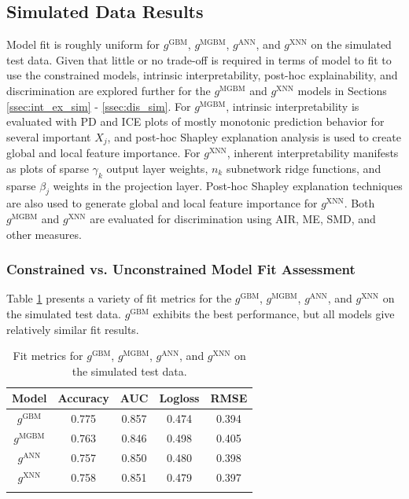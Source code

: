 \documentclass[information,article,submit,moreauthors,pdftex]{definitions/mdpi}
\begin{document}
\subsection{Simulated Data Results}

Model fit is roughly uniform for $g^\text{GBM}$, $g^\text{MGBM}$, $g^\text{ANN}$, and $g^\text{XNN}$ on the simulated test data. Given that little or no trade-off is required in terms of model to fit to use the constrained models, intrinsic interpretability, post-hoc explainability, and discrimination are explored further for the $g^\text{MGBM}$ and $g^\text{XNN}$ models in Sections \ref{ssec:int_ex_sim} - \ref{ssec:dis_sim}. For $g^\text{MGBM}$, intrinsic interpretability is evaluated with PD and ICE plots of mostly monotonic prediction behavior for several important $X_j$, and post-hoc Shapley explanation analysis is used to create global and local feature importance. For $g^\text{XNN}$, inherent interpretability manifests as plots of sparse $\gamma_k$ output layer weights, $n_k$ subnetwork ridge functions, and sparse $\beta_j$ weights in the projection layer. Post-hoc Shapley explanation techniques are also used to generate global and local feature importance for $g^\text{XNN}$. Both $g^\text{MGBM}$ and $g^\text{XNN}$ are evaluated for discrimination using AIR, ME, SMD, and other measures.

\subsubsection{Constrained vs. Unconstrained Model Fit Assessment}\label{ssec: c_v_uc_sim}

Table \ref{tab:sim_acc} presents a variety of fit metrics for the $g^\text{GBM}$, $g^\text{MGBM}$, $g^\text{ANN}$, and $g^\text{XNN}$ on the simulated test data. $g^\text{GBM}$ exhibits the best performance, but all models give relatively similar fit results.

\begin{table}[H]
\caption{Fit metrics for $g^\text{GBM}$, $g^\text{MGBM}$, $g^\text{ANN}$, and $g^\text{XNN}$ on the simulated test data.}
\centering
\begin{tabular}{ccccc}
\toprule
\textbf{Model}		& \textbf{Accuracy}	& \textbf{AUC}	 & \textbf{Logloss}	& \textbf{RMSE}\\
\midrule
$g^\text{GBM}$		& 0.775	& 0.857	& 0.474	& 0.394 \\
$g^\text{MGBM}$	& 0.763	& 0.846	& 0.498	& 0.405 \\
$g^\text{ANN}$		& 0.757	& 0.850	& 0.480	& 0.398 \\
$g^\text{XNN}$		& 0.758	& 0.851	& 0.479	& 0.397 \\
\bottomrule
\label{tab:sim_acc}
\end{tabular}
\end{table}
\end{document}
